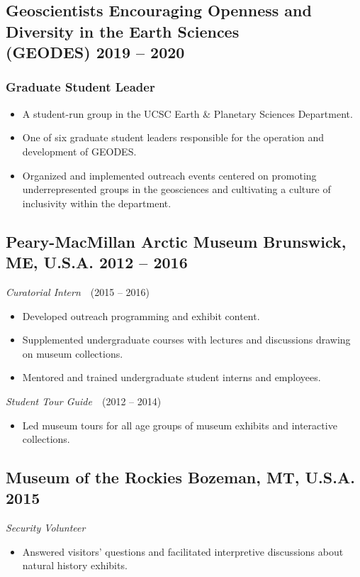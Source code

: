 \subsection*{\textbf{Geoscientists Encouraging Openness and Diversity in the Earth Sciences\\(GEODES)} \hfill 2019 – 2020}
\subsubsection*{Graduate Student Leader}
\begin{itemize}
	\item A student-run group in the UCSC Earth \& Planetary Sciences Department.
	\item One of six graduate student leaders responsible for the operation and development of GEODES.
	\item Organized and implemented outreach events centered on promoting underrepresented groups in the geosciences and cultivating a culture of inclusivity within the department.
\end{itemize}

\subsection*{\textbf{Peary-MacMillan Arctic Museum} \hspace{15pt} Brunswick, ME, U.S.A. \hfill 2012 – 2016}
\textit{Curatorial Intern}~~(2015 – 2016)
\begin{itemize}
	\item Developed outreach programming and exhibit content.
	\item Supplemented undergraduate courses with lectures and discussions drawing on museum collections.
	\item Mentored and trained undergraduate student interns and employees.
\end{itemize}

\textit{Student Tour Guide}~~(2012 – 2014)
\begin{itemize}
	\item Led museum tours for all age groups of museum exhibits and interactive collections.
\end{itemize}

\subsection*{\textbf{Museum of the Rockies} \hspace{15pt} Bozeman, MT, U.S.A. \hfill 2015}
\textit{Security Volunteer}
\begin{itemize}
	\item Answered visitors' questions and facilitated interpretive discussions about natural history exhibits.
\end{itemize}